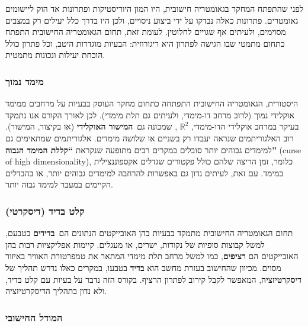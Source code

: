 \documentclass[
]{book}
\theoremstyle{definition}
\theoremstyle{definition}
\theoremstyle{definition}
\theoremstyle{definition}
\theoremstyle{remark}
\begin{document}
לפני שהתפתח המחקר בגאומטריה חישובית, היו המון היוריסטיקות ופתרונות אד הוק ליישומים גאומטרים. פתרונות כאלה נבדקו על ידי ביצוע ניסויים, ולכן היו בדרך כלל יעילים רק במצבים מסוימים, ולעיתים אף שגויים לחלוטין. לעומת זאת, תחום הגאומטריה החישובית התפתח כתחום מתמטי שבו הגישה לפתרון היא ריגורוזית: הבעיות מוגדרות היטב, וכל פתרון כולל הוכחת יעילות ונכונות מתמטית.

\hypertarget{ux5deux5d9ux5deux5d3-ux5e0ux5deux5d5ux5da}{%
\subsubsection*{\texorpdfstring{\textbf{מימד נמוך}}{מימד נמוך}}\label{ux5deux5d9ux5deux5d3-ux5e0ux5deux5d5ux5da}}

היסטורית, הגאומטריה החישובית התפתחה כתחום מחקר העוסק בבעיות על מרחבים ממימד אוקלידי נמוך (לרוב מרחב דו-מימדי, ולעיתים גם תלת מימדי). לכן לאורך הקורס אנו נתמקד בעיקר במרחב אוקלידי הדו-מימדי, \(\mathbb{R}^2\) , שמכונה גם~\textbf{המישור האוקלידי} (או בקיצור, המישור). רוב האלגוריתמים שנראה יעבדו רק בשניים או שלושה מימדים. אלגוריתמים שמתאימים גם למימדים גבוהים יותר סובלים במקרים רבים מתופעה שנקראת \textbf{``קללת המימד הגבוה''} (curse of high dimensionality), כלומר, זמן הריצה שלהם כולל פקטורים שגדלים אקספוננצילית במימד. עם זאת, לעיתים נדון גם באפשרות להרחבה למימדים גבוהים יותר, או בהבדלים הקיימים במעבר למימד גבוה יותר.

\hypertarget{ux5e7ux5dcux5d8-ux5d1ux5d3ux5d9ux5d3-ux5d3ux5d9ux5e1ux5e7ux5e8ux5d8ux5d9}{%
\subsubsection*{\texorpdfstring{\textbf{קלט בדיד (דיסקרטי)}}{קלט בדיד (דיסקרטי)}}\label{ux5e7ux5dcux5d8-ux5d1ux5d3ux5d9ux5d3-ux5d3ux5d9ux5e1ux5e7ux5e8ux5d8ux5d9}}

תחום הגאומטריה החישובית מתמקד בבעיות בהן האובייקטים הנתונים הם~\textbf{בדידים} בטבעם, למשל קבוצות סופיות של נקודות, ישרים, או מעגלים. קיימות אפליקציות רבות בהן האובייקטים הם \textbf{רציפים}, כמו למשל מרחב תלת מימדי המתאר את טמפרטורת האוויר באיזור מסוים. מכיוון שהחישוב בעזרת מחשב הוא \textbf{בדיד} בטבעו, במקרים כאלו נדרש תהליך של \textbf{דיסקרטיזציה}, המאפשר לקבל קירוב לפתרון הרציף. בקורס הזה נדבר על בעיות עם קלט בדיד, ולא נדון בתהליך הדיסקרטיזציה.

\hypertarget{ux5d4ux5deux5d5ux5d3ux5dc-ux5d4ux5d7ux5d9ux5e9ux5d5ux5d1ux5d9}{%
\subsubsection*{\texorpdfstring{\textbf{המודל החישובי}}{המודל החישובי}}\label{ux5d4ux5deux5d5ux5d3ux5dc-ux5d4ux5d7ux5d9ux5e9ux5d5ux5d1ux5d9}}
\end{document}
